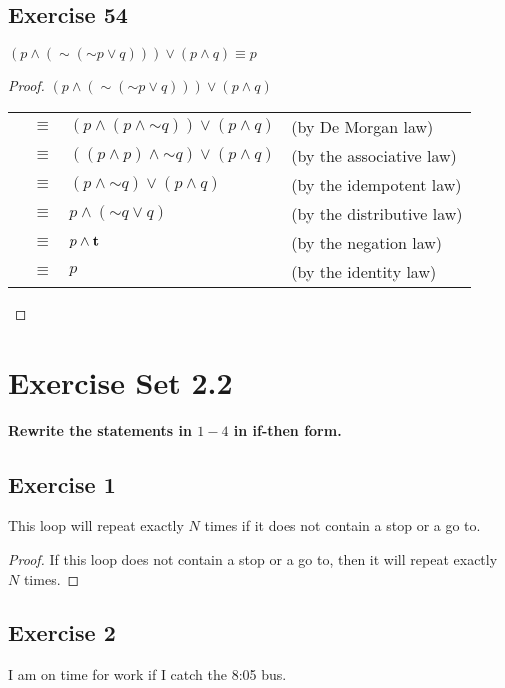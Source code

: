 \documentclass[14pt]{extarticle}
\newcommand{\true}{{\bf t}}
\begin{document}
\subsection{Exercise 54}
$(p \wedge ({\sim ({\sim p} \vee q)})) \vee (p \wedge q) \equiv p$

\begin{proof}
    $(p \wedge ({\sim ({\sim p} \vee q)})) \vee (p \wedge q)$

    \begin{tabular}{rcll}
         & $\equiv$ & $(p \wedge (p \wedge {\sim q})) \vee (p \wedge q)$ & (by De Morgan law)        \\
         & $\equiv$ & $((p \wedge p) \wedge {\sim q}) \vee (p \wedge q)$ & (by the associative law)  \\
         & $\equiv$ & $(p \wedge {\sim q}) \vee (p \wedge q)$            & (by the idempotent law)   \\
         & $\equiv$ & $p \wedge ({\sim q} \vee q)$                       & (by the distributive law) \\
         & $\equiv$ & $p \wedge \true$                                   & (by the negation law)     \\
         & $\equiv$ & $p$                                                & (by the identity law)     \\
    \end{tabular}
\end{proof}

\section{Exercise Set 2.2}
 {\bf Rewrite the statements in $1-4$ in if-then form.}

\subsection{Exercise 1}
This loop will repeat exactly $N$ times if it does not contain a stop or a go to.

\begin{proof}
    If this loop does not contain a stop or a go to, then it will
    repeat exactly $N$ times.
\end{proof}

\subsection{Exercise 2}
I am on time for work if I catch the 8:05 bus.
\end{document}
